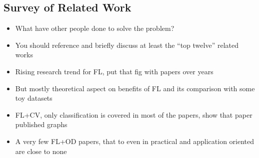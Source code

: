 \documentclass[thesis]{mas_proposal}
\begin{document}
\subsection{Survey of Related Work}
\begin{itemize}



      \item What have other people done to solve the problem?
      \item You should reference and briefly discuss at least the ``top twelve'' related works
      \item Rising research trend for FL, put that fig with papers over years
      \item But mostly theoretical aspect on benefits of FL and its comparison with some toy datasets 
      \item FL+CV, only classification is covered in most of the papers, show that paper published graphs
      \item A very few FL+OD papers, that to even in practical and application oriented are close to none
      

\end{itemize}
\end{document}
